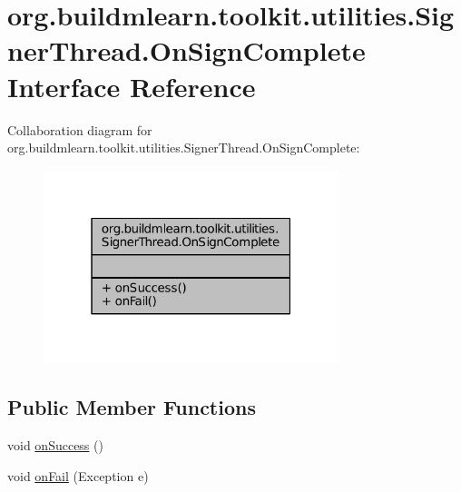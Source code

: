\hypertarget{interfaceorg_1_1buildmlearn_1_1toolkit_1_1utilities_1_1SignerThread_1_1OnSignComplete}{\section{org.\-buildmlearn.\-toolkit.\-utilities.\-Signer\-Thread.\-On\-Sign\-Complete Interface Reference}
\label{interfaceorg_1_1buildmlearn_1_1toolkit_1_1utilities_1_1SignerThread_1_1OnSignComplete}
}


Collaboration diagram for org.\-buildmlearn.\-toolkit.\-utilities.\-Signer\-Thread.\-On\-Sign\-Complete\-:
\nopagebreak
\begin{figure}[H]
\begin{center}
\leavevmode
\includegraphics[width=244pt]{d2/d1c/interfaceorg_1_1buildmlearn_1_1toolkit_1_1utilities_1_1SignerThread_1_1OnSignComplete__coll__graph}
\end{center}
\end{figure}
\subsection*{Public Member Functions}
\begin{DoxyCompactItemize}
\item 
void \hyperlink{interfaceorg_1_1buildmlearn_1_1toolkit_1_1utilities_1_1SignerThread_1_1OnSignComplete_ab7e78f8388d58aca0a1b4c1a316b05b2}{on\-Success} ()
\item 
void \hyperlink{interfaceorg_1_1buildmlearn_1_1toolkit_1_1utilities_1_1SignerThread_1_1OnSignComplete_a04b8e29a0ef97785dba2555069f9ed9d}{on\-Fail} (Exception e)
\end{DoxyCompactItemize}


